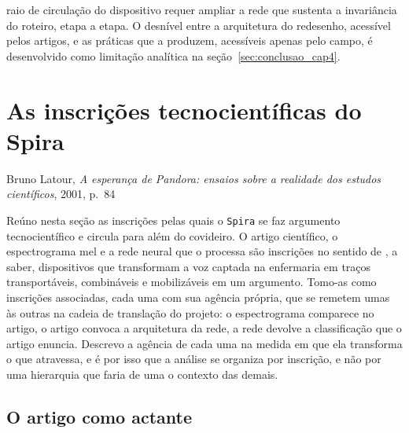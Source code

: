 raio de circulação do dispositivo requer ampliar a rede que sustenta a invariância do roteiro, etapa a etapa. O desnível entre a arquitetura do redesenho, acessível pelos artigos, e as práticas que a produzem, acessíveis apenas pelo campo, é desenvolvido como limitação analítica na seção~\ref{sec:conclusao_cap4}.

\section{As inscrições tecnocientíficas do Spira}
\label{sec:inscricoes_tecnocientificas}

%
{Bruno Latour, \textit{A esperança de Pandora: ensaios sobre a realidade dos estudos científicos}, 2001, p.~84}

Reúno nesta seção as inscrições pelas quais o \texttt{Spira} se faz argumento tecnocientífico e circula para além do covideiro. O artigo científico, o espectrograma mel e a rede neural que o processa são inscrições no sentido de \textcite{Latour1986Visualization}, a saber, dispositivos que transformam a voz captada na enfermaria em traços transportáveis, combináveis e mobilizáveis em um argumento. Tomo-as como inscrições associadas, cada uma com sua agência própria, que se remetem umas às outras na cadeia de translação do projeto: o espectrograma comparece no artigo, o artigo convoca a arquitetura da rede, a rede devolve a classificação que o artigo enuncia. Descrevo a agência de cada uma na medida em que ela transforma o que atravessa, e é por isso que a análise se organiza por inscrição, e não por uma hierarquia que faria de uma o contexto das demais.

\subsection{O artigo como actante}
\label{subsec:artigo_actante}

